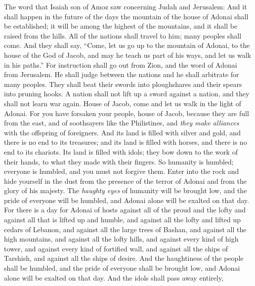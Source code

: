 \begin{biblechapter} %
 The word that Isaiah son of Amoz saw concerning Judah and Jerusalem:
\verse And it shall happen in the future of the days 
the mountain of the house of Adonai shall be established; 
it will be among the highest of the mountains, 
and it shall be raised from the hills. 
All of the nations shall travel to him;
\verse many peoples shall come. 
And they shall say, 
“Come, let us go up to the mountain of Adonai, 
to the house of the God of Jacob, 
and may he teach us part of his ways, 
and let us walk in his paths.” 
For instruction shall go out from Zion, 
and the word of Adonai from Jerusalem.
\verse He shall judge between the nations 
and he shall arbitrate for many peoples. 
They shall beat their swords into ploughshares 
and their spears into pruning hooks. 
A nation shall not lift up a sword against a nation, 
and they shall not learn war again.
 House of Jacob, come and let us walk in the light of Adonai.
\verse For you have forsaken your people, house of Jacob, 
because they are full from the east, 
and of soothsayers like the Philistines, 
and \textit{they make alliances} with the offspring of foreigners.
\verse And its land is filled with silver and gold, 
and there is no end to its treasures; 
and its land is filled with horses, 
and there is no end to its chariots.
\verse Its land is filled with idols; 
they bow down to the work of their hands, 
to what they made with their fingers.
\verse So humanity is humbled; 
everyone is humbled, 
and you must not forgive them.
\verse Enter into the rock 
and hide yourself in the dust 
from the presence of the terror of Adonai 
and from the glory of his majesty.
\verse The \textit{haughty eyes} of humanity will be brought low, 
and the pride of everyone will be humbled, 
and Adonai alone will be exalted on that day.
\verse For there is a day for Adonai of hosts 
against all of the proud and the lofty 
and against all that is lifted up and humble,
\verse and against all the lofty and lifted up cedars of Lebanon, 
and against all the large trees of Bashan,
\verse and against all the high mountains, 
and against all the lofty hills,
\verse and against every kind of high tower, 
and against every kind of fortified wall,
\verse and against all the ships of Tarshish, 
and against all the ships of desire.
\verse And the haughtiness of the people shall be humbled, 
and the pride of everyone shall be brought low, 
and Adonai alone will be exalted on that day.
\verse And the idols shall pass away entirely,

\end{biblechapter}
